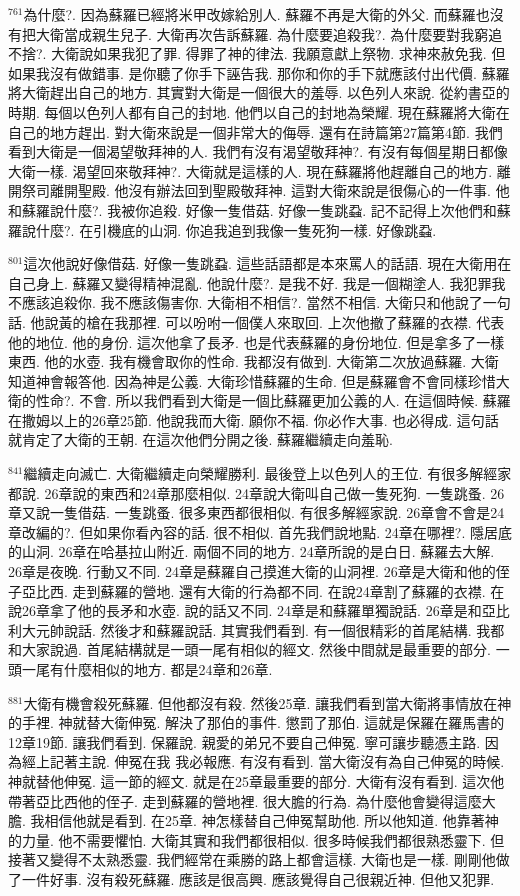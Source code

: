 \documentclass{book}
\begin{document}
$^{761}$為什麼?.
因為蘇羅已經將米甲改嫁給別人.
蘇羅不再是大衛的外父.
而蘇羅也沒有把大衛當成親生兒子.
大衛再次告訴蘇羅.
為什麼要追殺我?.
為什麼要對我窮追不捨?.
大衛說如果我犯了罪.
得罪了神的律法.
我願意獻上祭物.
求神來赦免我.
但如果我沒有做錯事.
是你聽了你手下誣告我.
那你和你的手下就應該付出代價.
蘇羅將大衛趕出自己的地方.
其實對大衛是一個很大的羞辱.
以色列人來說.
從約書亞的時期.
每個以色列人都有自己的封地.
他們以自己的封地為榮耀.
現在蘇羅將大衛在自己的地方趕出.
對大衛來說是一個非常大的侮辱.
還有在詩篇第27篇第4節.
我們看到大衛是一個渴望敬拜神的人.
我們有沒有渴望敬拜神?.
有沒有每個星期日都像大衛一樣.
渴望回來敬拜神?.
大衛就是這樣的人.
現在蘇羅將他趕離自己的地方.
離開祭司離開聖殿.
他沒有辦法回到聖殿敬拜神.
這對大衛來說是很傷心的一件事.
他和蘇羅說什麼?.
我被你追殺.
好像一隻借菇.
好像一隻跳蝨.
記不記得上次他們和蘇羅說什麼?.
在引機底的山洞.
你追我追到我像一隻死狗一樣.
好像跳蝨.

$^{801}$這次他說好像借菇.
好像一隻跳蝨.
這些話語都是本來罵人的話語.
現在大衛用在自己身上.
蘇羅又變得精神混亂.
他說什麼?.
是我不好.
我是一個糊塗人.
我犯罪我不應該追殺你.
我不應該傷害你.
大衛相不相信?.
當然不相信.
大衛只和他說了一句話.
他說黃的槍在我那裡.
可以吩咐一個僕人來取回.
上次他撤了蘇羅的衣襟.
代表他的地位.
他的身份.
這次他拿了長矛.
也是代表蘇羅的身份地位.
但是拿多了一樣東西.
他的水壺.
我有機會取你的性命.
我都沒有做到.
大衛第二次放過蘇羅.
大衛知道神會報答他.
因為神是公義.
大衛珍惜蘇羅的生命.
但是蘇羅會不會同樣珍惜大衛的性命?.
不會.
所以我們看到大衛是一個比蘇羅更加公義的人.
在這個時候.
蘇羅在撒姆以上的26章25節.
他說我而大衛.
願你不福.
你必作大事.
也必得成.
這句話就肯定了大衛的王朝.
在這次他們分開之後.
蘇羅繼續走向羞恥.

$^{841}$繼續走向滅亡.
大衛繼續走向榮耀勝利.
最後登上以色列人的王位.
有很多解經家都說.
26章說的東西和24章那麼相似.
24章說大衛叫自己做一隻死狗.
一隻跳蚤.
26章又說一隻借菇.
一隻跳蚤.
很多東西都很相似.
有很多解經家說.
26章會不會是24章改編的?.
但如果你看內容的話.
很不相似.
首先我們說地點.
24章在哪裡?.
隱居底的山洞.
26章在哈基拉山附近.
兩個不同的地方.
24章所說的是白日.
蘇羅去大解.
26章是夜晚.
行動又不同.
24章是蘇羅自己摸進大衛的山洞裡.
26章是大衛和他的侄子亞比西.
走到蘇羅的營地.
還有大衛的行為都不同.
在說24章割了蘇羅的衣襟.
在說26章拿了他的長矛和水壺.
說的話又不同.
24章是和蘇羅單獨說話.
26章是和亞比利大元帥說話.
然後才和蘇羅說話.
其實我們看到.
有一個很精彩的首尾結構.
我都和大家說過.
首尾結構就是一頭一尾有相似的經文.
然後中間就是最重要的部分.
一頭一尾有什麼相似的地方.
都是24章和26章.

$^{881}$大衛有機會殺死蘇羅.
但他都沒有殺.
然後25章.
讓我們看到當大衛將事情放在神的手裡.
神就替大衛伸冤.
解決了那伯的事件.
懲罰了那伯.
這就是保羅在羅馬書的12章19節.
讓我們看到.
保羅說.
親愛的弟兄不要自己伸冤.
寧可讓步聽憑主路.
因為經上記著主說.
伸冤在我 我必報應.
有沒有看到.
當大衛沒有為自己伸冤的時候.
神就替他伸冤.
這一節的經文.
就是在25章最重要的部分.
大衛有沒有看到.
這次他帶著亞比西他的侄子.
走到蘇羅的營地裡.
很大膽的行為.
為什麼他會變得這麼大膽.
我相信他就是看到.
在25章.
神怎樣替自己伸冤幫助他.
所以他知道.
他靠著神的力量.
他不需要懼怕.
大衛其實和我們都很相似.
很多時候我們都很熟悉靈下.
但接著又變得不太熟悉靈.
我們經常在乘勝的路上都會這樣.
大衛也是一樣.
剛剛他做了一件好事.
沒有殺死蘇羅.
應該是很高興.
應該覺得自己很親近神.
但他又犯罪.
\end{document}
